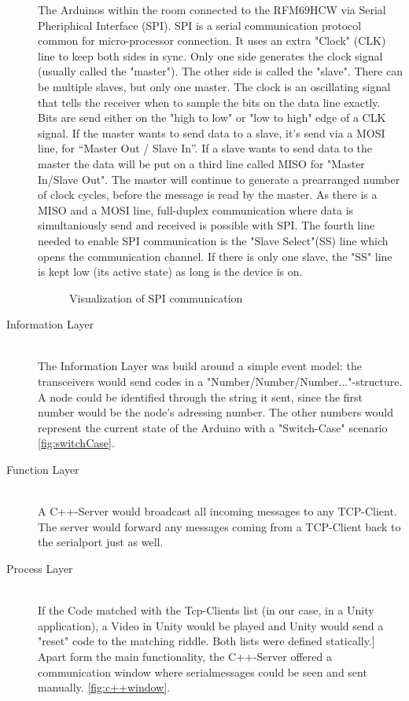 \begin{description}
          The Arduinos within the room connected to the RFM69HCW via Serial Pheriphical Interface (SPI).
          SPI is a serial communication protocol common for micro-processor connection. 
          It uses an extra "Clock" (CLK) line to keep both sides in sync. 
          Only one side generates the clock signal (usually called the "master"). The other side is called the "slave".
          There can be multiple slaves, but only one master.
          The clock is an oscillating signal that tells 
          the receiver when to sample the bits on the data line exactly. 
          Bits are send either on the "high to low" or "low to high" edge of a CLK signal.
          If the master wants to send data to a slave, it's send via a MOSI line, for “Master Out / Slave In”.
          If a slave wants to send data to the master the data will be put on a third line called MISO for "Master In/Slave Out".
          The master will continue to generate a prearranged number of clock cycles, before the message is read by the master.
          As there is a MISO and a MOSI line, full-duplex communication where data is simultaniously send and received is possible with SPI.
          The fourth line needed to enable SPI communication is the "Slave Select"(SS) line which opens the communication channel. 
          If there is only one slave, the "SS" line is kept low (its active state) as long is the device is on. 

          \begin{figure*}[h]
            \centering
            \caption{Visualization of SPI communication}
          \end{figure*}
          
	\item[Information Layer]\hfill \\
        The Information Layer was build around a simple event model: the transceivers would send codes in a "Number/Number/Number..."-structure. 
        A node could be identified through the string it sent, since the first number would be the node's adressing number. 
        The other numbers would represent the current state of the Arduino with a "Switch-Case" scenario \ref{fig:switchCase}. 
	\item[Function Layer]\hfill \\
        A C++-Server would broadcast all incoming messages to any TCP-Client.    
        The server would forward any messages coming from a TCP-Client back to the serialport just as well.
	\item[Process Layer]\hfill \\
	If the Code matched with the Tcp-Clients list (in our case, in a Unity application), a Video in Unity would be played and Unity would send a "reset" code to the matching riddle. 
    Both lists were defined statically.] 
	Apart form the main functionality, the C++-Server offered a communication window where serialmessages 
    could be seen and sent manually. \ref{fig:c++window}.

\end{description}

